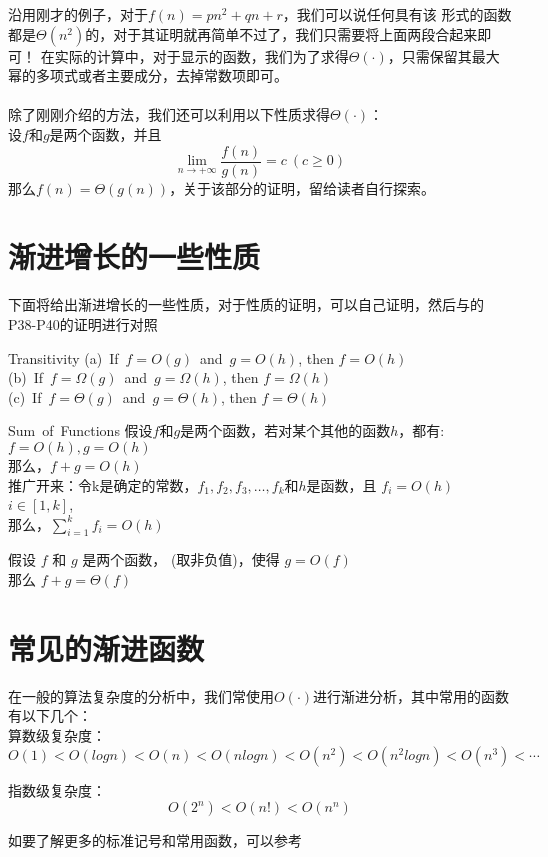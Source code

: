 沿用刚才的例子，对于$f(n)=pn^2+qn+r$，我们可以说任何具有该
形式的函数都是$\Theta(n^2)$的，对于其证明就再简单不过了，我们只需要将上面两段合起来即可！
在实际的计算中，对于显示的函数，我们为了求得$\Theta(\cdot)$，只需保留其最大幂的多项式或者主要成分，去掉常数项即可。
\\
\\
除了刚刚介绍的方法，我们还可以利用以下性质求得$\Theta(\cdot)$：
\\
设$f$和$g$是两个函数，并且
\[
	\lim_{n\rightarrow+\infty}\frac{f(n)}{g(n)} = c \ (c\ge 0)
\]
那么$f(n)=\Theta(g(n))$，关于该部分的证明，留给读者自行探索。

\section{渐进增长的一些性质}
下面将给出渐进增长的一些性质，对于性质的证明，可以自己证明，然后与\cite{textbook1}的P38-P40的证明进行对照
\begin{theorem}{Transitivity}{}
	(a)\ If\ $f=O(g)$\ and\ $g=O(h)$, then $f=O(h)$\\
	(b)\ If\ $f=\Omega(g)$\ and\ $g=\Omega(h)$, then $f=\Omega(h)$\\
	(c)\ If\ $f=\Theta(g)$\ and\ $g=\Theta(h)$, then $f=\Theta(h)$
\end{theorem}

\begin{theorem}{Sum\ of\ Functions}{}
	假设$f$和$g$是两个函数，若对某个其他的函数$h$，都有:$f=O(h),g=O(h)$\\
	那么，$f+g=O(h)$\\
	推广开来：令k是确定的常数，$f_1,f_2,f_3,\ldots,f_k$和$h$是函数，且
	$f_i=O(h)$ \ \ $i\in [1,k]$,\\
	那么，$\sum^{k}_{i=1}f_i=O(h)$
\end{theorem}

\begin{theorem}{}{}
	假设 $f$ 和 $g$ 是两个函数， (取非负值)，使得 $g = O(f)$ \\
	那么 $f+g=\Theta(f)$
\end{theorem}

\section{常见的渐进函数}
在一般的算法复杂度的分析中，我们常使用$O(\cdot)$进行渐进分析，其中常用的函数有以下几个：\\
算数级复杂度：
\[
	O(1)<O(logn)<O(n)<O(nlogn)<O(n^2)<O(n^2logn)<O(n^3)< \cdots
\]

指数级复杂度：
\[
	O(2^n)<O(n!)<O(n^n)
\]

如要了解更多的标准记号和常用函数，可以参考~\cite{cormen2009introduction}
